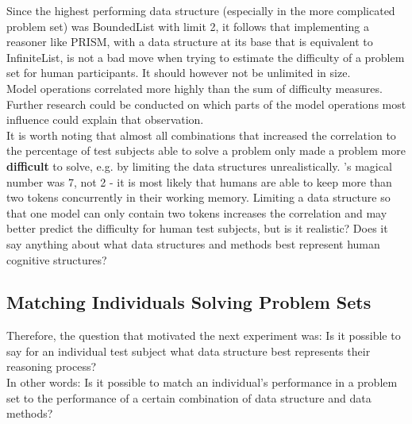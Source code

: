\documentclass[hidelinks]{scrartcl}
\begin{document}
Since the highest performing data structure (especially in the more complicated problem set) was BoundedList with limit 2, it follows that implementing a reasoner like PRISM, with a data structure at its base that is equivalent to InfiniteList, is not a bad move when trying to estimate the difficulty of a problem set for human participants. It should however not be unlimited in size. \\
Model operations correlated more highly than the sum of difficulty measures. Further research could be conducted on which parts of the model operations most influence could explain that observation. \\
It is worth noting that almost all combinations that increased the correlation to the percentage of test subjects able to solve a problem only made a problem more \textbf{difficult} to solve, e.g. by limiting the data structures unrealistically. \cite{Miller.1956}'s magical number was 7, not 2 - it is most likely that humans are able to keep more than two \gls{token}s concurrently in their \gls{working memory}. Limiting a data structure so that one model can only contain two \gls{token}s increases the correlation and may better predict the difficulty for human test subjects, but is it realistic? Does it say anything about what data structures and methods best represent human cognitive structures?

\subsection{Matching Individuals Solving Problem Sets}
Therefore, the question that motivated the next experiment was: Is it possible to say for an individual test subject what data structure best represents their reasoning process? \\
In other words: Is it possible to match an individual's performance in a problem set to the performance of a certain combination of data structure and data methods?\\
\end{document}

